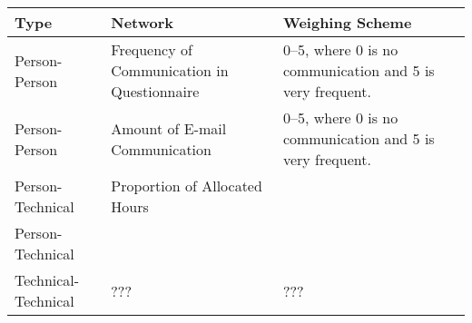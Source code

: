 \begin{tabularx}{\columnwidth}{|X >{\raggedright}X >{\raggedright}X|}
\hline
Type & Network & Weighing Scheme \\\hline
Person-Person & Frequency of Communication in Questionnaire & 0--5, where 0 is no communication and 5 is very frequent. \\\hline
Person-Person & Amount of E-mail Communication & 0--5, where 0 is no communication and 5 is very frequent. \\\hline
Person-Technical & Proportion of Allocated Hours & \\\hline
Person-Technical &  & \\\hline
Technical-Technical & ??? & ??? \\\hline
\end{tabularx}